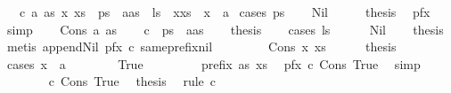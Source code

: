 \begin{isabellebody}
\ \ {\isacharbar}\ {\isacharparenleft}c{}{\isacharparenright}\ a\ as\ x\ xs\ \ {\isachardoublequoteopen}ps\ {\isacharequal}\ a{\isacharhash}as{\isachardoublequoteclose}\ \ {\isachardoublequoteopen}ls\ {\isacharequal}\ x{\isacharhash}xs{\isachardoublequoteclose}\ \ {\isachardoublequoteopen}x\ {\isasymnoteq}\ a{\isachardoublequoteclose}\isanewline
%
\isadelimproof
%
\endisadelimproof
%
\isatagproof
{}\isamarkupfalse%
\ {\isacharparenleft}cases\ ps{\isacharparenright}\isanewline
\ \ \isamarkupfalse%
\ Nil\isanewline
\ \ \isamarkupfalse%
\ \isamarkupfalse%
\ {\isacharquery}thesis\ \isamarkupfalse%
\ pfx\ \isamarkupfalse%
\ simp\isanewline
{}\isamarkupfalse%
\isanewline
\ \ \isamarkupfalse%
\ {\isacharparenleft}Cons\ a\ as{\isacharparenright}\isanewline
\ \ \isamarkupfalse%
\ c\ {\isacharequal}\ {\isacartoucheopen}ps\ {\isacharequal}\ a{\isacharhash}as{\isacartoucheclose}\isanewline
\ \ \isamarkupfalse%
\ {\isacharquery}thesis\isanewline
\ \ \isamarkupfalse%
\ {\isacharparenleft}cases\ ls{\isacharparenright}\isanewline
\ \ \ \ \isamarkupfalse%
\ Nil\ \isamarkupfalse%
\ \isamarkupfalse%
\ {\isacharquery}thesis\ \isamarkupfalse%
\ {\isacharparenleft}metis\ append{\isacharunderscore}Nil{}\ pfx\ c{}\ same{\isacharunderscore}prefix{\isacharunderscore}nil{\isacharparenright}\isanewline
\ \ \isamarkupfalse%
\isanewline
\ \ \ \ \isamarkupfalse%
\ {\isacharparenleft}Cons\ x\ xs{\isacharparenright}\isanewline
\ \ \ \ \isamarkupfalse%
\ {\isacharquery}thesis\isanewline
\ \ \ \ \isamarkupfalse%
\ {\isacharparenleft}cases\ {\isachardoublequoteopen}x\ {\isacharequal}\ a{\isachardoublequoteclose}{\isacharparenright}\isanewline
\ \ \ \ \ \ \isamarkupfalse%
\ True\isanewline
\ \ \ \ \ \ \isamarkupfalse%
\ {\isachardoublequoteopen}{\isasymnot}\ prefix\ as\ xs{\isachardoublequoteclose}\ \isamarkupfalse%
\ pfx\ c\ Cons\ True\ \isamarkupfalse%
\ simp\isanewline
\ \ \ \ \ \ \isamarkupfalse%
\ c\ Cons\ True\ \isamarkupfalse%
\ {\isacharquery}thesis\ \isamarkupfalse%
\ {\isacharparenleft}rule\ c{}{\isacharparenright}\isanewline
\ \ \ \ \isamarkupfalse%

\end{isabellebody}
